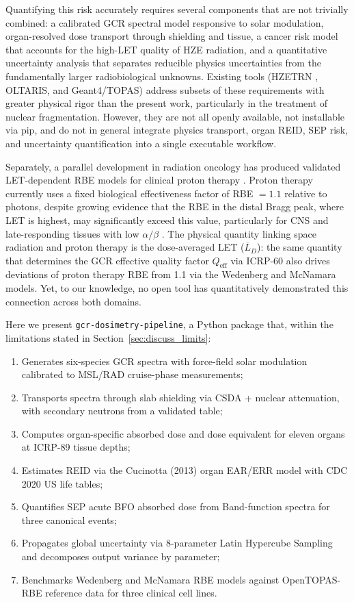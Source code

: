 \documentclass[12pt,letterpaper]{article}
\newcommand{\Qeff}{Q_\mathrm{eff}}
\newcommand{\LETd}{\overline{L}_D}
\newcommand{\code}[1]{\texttt{#1}}
\begin{document}
Quantifying this risk accurately requires several components that are not
trivially combined: a calibrated GCR spectral model responsive to solar
modulation, organ-resolved dose transport through shielding and tissue,
a cancer risk model that accounts for the high-LET quality of HZE radiation,
and a quantitative uncertainty analysis that separates reducible physics
uncertainties from the fundamentally larger radiobiological unknowns.
Existing tools (HZETRN \citep{wilson1991}, OLTARIS, and Geant4/TOPAS) address
subsets of these requirements with greater physical rigor than the present
work, particularly in the treatment of nuclear fragmentation.
However, they are not all openly available, not installable via pip, and do not
in general integrate physics transport, organ REID, SEP risk, and uncertainty
quantification into a single executable workflow.

Separately, a parallel development in radiation oncology has produced
validated LET-dependent RBE models for clinical proton therapy
\citep{wedenberg2013, mcnamara2015}.
Proton therapy currently uses a fixed biological effectiveness factor of RBE
$= 1.1$ relative to photons, despite growing evidence that the RBE in the
distal Bragg peak, where LET is highest, may significantly exceed this value,
particularly for CNS and late-responding tissues with low
$\alpha/\beta$ \citep{paganetti2014}.
The physical quantity linking space radiation and proton therapy is the
dose-averaged LET ($\LETd$): the same quantity that determines the GCR
effective quality factor $\Qeff$ via ICRP-60 also drives deviations of proton
therapy RBE from 1.1 via the Wedenberg and McNamara models.
Yet, to our knowledge, no open tool has quantitatively demonstrated this
connection across both domains.

Here we present \code{gcr-dosimetry-pipeline}, a Python package that, within
the limitations stated in Section~\ref{sec:discuss_limits}:
\begin{enumerate}[leftmargin=*, label=\arabic*.]
  \item Generates six-species GCR spectra with force-field solar modulation
        calibrated to MSL/RAD cruise-phase measurements;
  \item Transports spectra through slab shielding via CSDA + nuclear
        attenuation, with secondary neutrons from a validated table;
  \item Computes organ-specific absorbed dose and dose equivalent for
        eleven organs at ICRP-89 tissue depths;
  \item Estimates REID via the Cucinotta (2013) organ EAR/ERR model with
        CDC 2020 US life tables;
  \item Quantifies SEP acute BFO absorbed dose from Band-function spectra
        for three canonical events;
  \item Propagates global uncertainty via 8-parameter Latin Hypercube
        Sampling and decomposes output variance by parameter;
  \item Benchmarks Wedenberg and McNamara RBE models against OpenTOPAS-RBE
        reference data for three clinical cell lines.
\end{enumerate}
\end{document}
